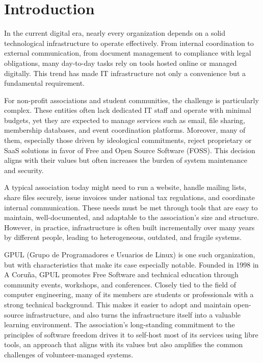 %

\chapter{Introduction}
\label{chap:introducion}

In the current digital era, nearly every organization depends on a solid technological infrastructure to operate effectively. From internal coordination to external communication, from document management to compliance with legal obligations, many day-to-day tasks rely on tools hosted online or managed digitally. This trend has made IT infrastructure not only a convenience but a fundamental requirement.

For non-profit associations and student communities, the challenge is particularly complex. These entities often lack dedicated IT staff and operate with minimal budgets, yet they are expected to manage services such as email, file sharing, membership databases, and event coordination platforms. Moreover, many of them, especially those driven by ideological commitments, reject proprietary or SaaS solutions in favor of Free and Open Source Software (FOSS). This decision aligns with their values but often increases the burden of system maintenance and security.

A typical association today might need to run a website, handle mailing lists, share files securely, issue invoices under national tax regulations, and coordinate internal communication. These needs must be met through tools that are easy to maintain, well-documented, and adaptable to the association's size and structure. However, in practice, infrastructure is often built incrementally over many years by different people, leading to heterogeneous, outdated, and fragile systems.

GPUL (Grupo de Programadores e Usuarios de Linux) \cite{gpul_web} is one such organization, but with characteristics that make its case especially notable. Founded in 1998 in A Coruña, GPUL promotes Free Software and technical education through community events, workshops, and conferences. Closely tied to the field of computer engineering, many of its members are students or professionals with a strong technical background. This makes it easier to adopt and maintain open-source infrastructure, and also turns the infrastructure itself into a valuable learning environment. The association's long-standing commitment to the principles of software freedom drives it to self-host most of its services using libre tools, an approach that aligns with its values but also amplifies the common challenges of volunteer-managed systems.

